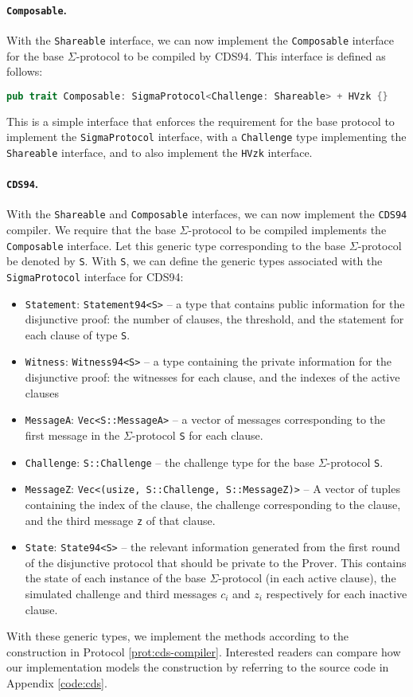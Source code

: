 \paragraph{\texttt{Composable}.} With the \texttt{Shareable} interface, we can now implement the \texttt{Composable}
interface for the base $\Sigma$-protocol to be compiled by CDS94. This interface is defined as follows:

\begin{lstlisting}[language=rust]
  pub trait Composable: SigmaProtocol<Challenge: Shareable> + HVzk {}
\end{lstlisting}

This is a simple interface that enforces the requirement for the base protocol to implement 
the \texttt{SigmaProtocol} interface, with a \texttt{Challenge} type implementing the \texttt{Shareable} 
interface, and to also implement the \texttt{HVzk} interface.

\paragraph{\texttt{CDS94}.} With the \texttt{Shareable} and \texttt{Composable} interfaces, we can now implement
the \texttt{CDS94} compiler. We require that the base $\Sigma$-protocol to be compiled implements the
\texttt{Composable} interface. Let this generic type corresponding to the base $\Sigma$-protocol be 
denoted by \texttt{S}. With \texttt{S}, we can define the generic types associated with the \texttt{SigmaProtocol} interface 
for CDS94:

\begin{itemize}
  \item \texttt{Statement}: \texttt{Statement94<S>} -- a type that contains public information 
  for the disjunctive proof: the number of clauses, the threshold, and the statement for each 
  clause of type \texttt{S}.
  \item \texttt{Witness}: \texttt{Witness94<S>} -- a type containing the private information for the 
  disjunctive proof: the witnesses for each clause, and the indexes of the active clauses 
  \item \texttt{MessageA}: \texttt{Vec<S::MessageA>} -- a vector of messages corresponding to the 
  first message in the $\Sigma$-protocol \texttt{S} for each clause.
  \item \texttt{Challenge}: \texttt{S::Challenge} -- the challenge type for the base $\Sigma$-protocol \texttt{S}.
  \item \texttt{MessageZ}: \texttt{Vec<(usize, S::Challenge, S::MessageZ)>} -- A vector of tuples containing 
  the index of the clause, the challenge corresponding to the clause, and the third message \texttt{z} 
  of that clause.
  \item \texttt{State}: \texttt{State94<S>} -- the relevant information generated from the first round
  of the disjunctive protocol that should be private to the Prover. This 
  contains the state of each instance of the base $\Sigma$-protocol (in each active clause), 
  the simulated challenge and 
  third messages $c_i$ and $z_i$ respectively for each inactive clause. 
\end{itemize}

With these generic types, we implement the methods according to the construction in Protocol \ref{prot:cds-compiler}.
Interested readers can compare how our implementation models the construction by referring to the source code 
in Appendix \ref{code:cds}.
